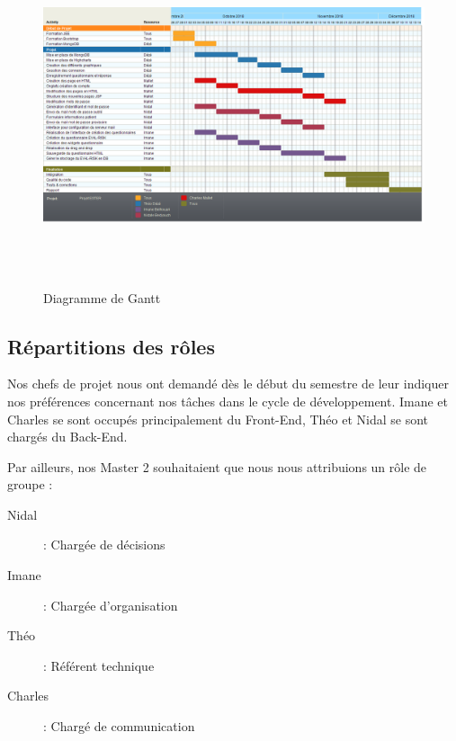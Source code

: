 \begin{figure}[H]
    \begin{center}
    \includegraphics[height=10.0cm]{img/gantt}
    \end{center}
    \caption{Diagramme de Gantt}
\end{figure}

\subsection{Répartitions des rôles}

Nos chefs de projet nous ont demandé dès le début du semestre de leur indiquer nos préférences concernant nos tâches dans le cycle de développement. Imane et Charles se sont occupés principalement du Front-End, Théo et Nidal se sont chargés du Back-End.

Par ailleurs, nos Master 2 souhaitaient que nous nous attribuions un rôle de groupe : 

\begin{description}
\item[Nidal] : Chargée de décisions
\item[Imane] : Chargée d'organisation
\item[Théo] : Référent technique
\item[Charles] : Chargé de communication
\end{description}
